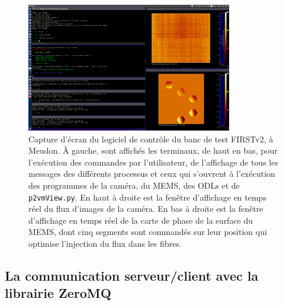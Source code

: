 \begin{figure}[ht!]
    \centering
    \includegraphics[width=0.8\textwidth]{Figure_Chap2/FIRSTv2_ControlSoftware_ScreenShot.png}
    \caption[Capture d'écran du logiciel de contrôle du banc de test FIRSTv2, à Meudon.]{Capture d'écran du logiciel de contrôle du banc de test FIRSTv2, à Meudon. À gauche, sont affichés les terminaux, de haut en bas, pour l'exécution des commandes par l'utilisateur, de l'affichage de tous les messages des différents processus et ceux qui s'ouvrent à l'exécution des programmes de la caméra, du MEMS, des ODLs et de \texttt{p2vmView.py}. En haut à droite est la fenêtre d'affichage en temps réel du flux d'images de la caméra. En bas à droite est la fenêtre d'affichage en temps réel de la carte de phase de la surface du MEMS, dont cinq segments sont commandés sur leur position qui optimise l'injection du flux dans les fibres.}
    \label{fig:SoftwareScreenShot}
\end{figure}


\subsection{La communication serveur/client avec la librairie ZeroMQ}
\label{sec:ZMQ}

